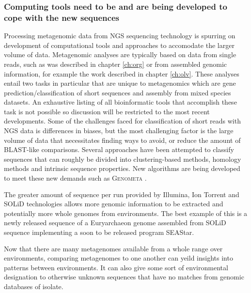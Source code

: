 \subsubsection{Computing tools need to be and are being developed to cope with the new sequences}
Processing metagenomic data from \ac{NGS} sequencing technology is spurring on development of computational tools and approaches to accomodate the larger volume of data.
Metagenomic analyses are typically based on data from single reads, such as was described in chapter \ref{ch:org} or from assembled genomic information, for example the work described in chapter \ref{ch:olv}.
These analyses entail two tasks in particular that are unique to metagenomics which are gene prediction/classification of short sequences and assembly from mixed species datasets. 
An exhaustive listing of all bioinformatic tools that accomplish these task is not possible so discussion will be restricted to the most recent developments.
Some of the challenges faced for classification of short reads with \ac{NGS} data is differences in biases, but the most challenging factor is the large volume of data that necessitates finding ways to avoid, or reduce the amount of BLAST-like comparisons.
Several approaches have been attempted to classify sequences that can roughly be divided into clustering-based methods, homology methods and intrinsic sequence properties.
New algorithms are being developed to meet these new demands such as \textsc{Genometa} \cite{Davenport2012}.

The greater amount of sequence per run provided by Illumina, Ion Torrent and SOLiD technologies allows more genomic information to be extracted and potentially more whole genomes from environments.
The best example of this is a newly released sequence of a Euryarchaeon genome assembled from SOLiD sequence implementing a soon to be released program SEAStar.

Now that there are many metagenomes available from a whole range over environments, comparing metagenomes to one another can yeild insights into patterns between environments.
It can also give some sort of environmental designation to otherwise unknown sequences that have no matches from genomic databases of isolate.



